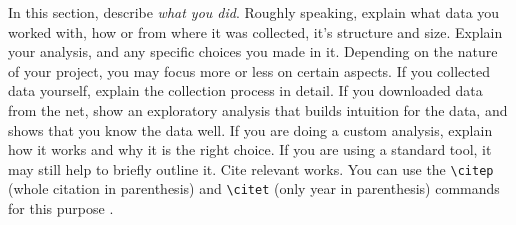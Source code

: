 In this section, describe \emph{what you did}. Roughly speaking, explain what data you worked with, how or from where it was collected, it's structure and size. Explain your analysis, and any specific choices you made in it. Depending on the nature of your project, you may focus more or less on certain aspects. If you collected data yourself, explain the collection process in detail. If you downloaded data from the net, show an exploratory analysis that builds intuition for the data, and shows that you know the data well. If you are doing a custom analysis, explain how it works and why it is the right choice. If you are using a standard tool, it may still help to briefly outline it. Cite relevant works. You can use the \verb|\citep| (whole citation in parenthesis) and \verb|\citet| (only year in parenthesis) commands for this purpose \citep{mackay2003information}.

% 

